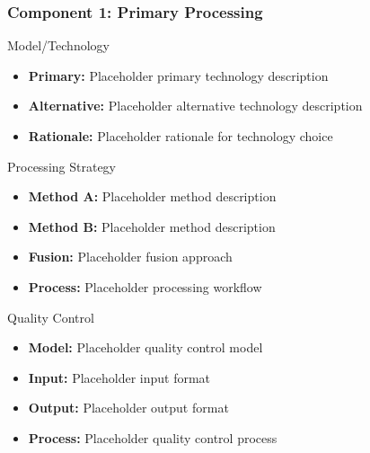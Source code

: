 \begin{frame}
\frametitle{Component 1: Primary Processing}
\begin{block}{Model/Technology}
\begin{itemize}
\item \textbf{Primary:} Placeholder primary technology description
\item \textbf{Alternative:} Placeholder alternative technology description
\item \textbf{Rationale:} Placeholder rationale for technology choice
\end{itemize}
\end{block}

\begin{block}{Processing Strategy}
\begin{itemize}
\item \textbf{Method A:} Placeholder method description
\item \textbf{Method B:} Placeholder method description
\item \textbf{Fusion:} Placeholder fusion approach
\item \textbf{Process:} Placeholder processing workflow
\end{itemize}
\end{block}

\begin{block}{Quality Control}
\begin{itemize}
\item \textbf{Model:} Placeholder quality control model
\item \textbf{Input:} Placeholder input format
\item \textbf{Output:} Placeholder output format
\item \textbf{Process:} Placeholder quality control process
\end{itemize}
\end{block}
\end{frame}

